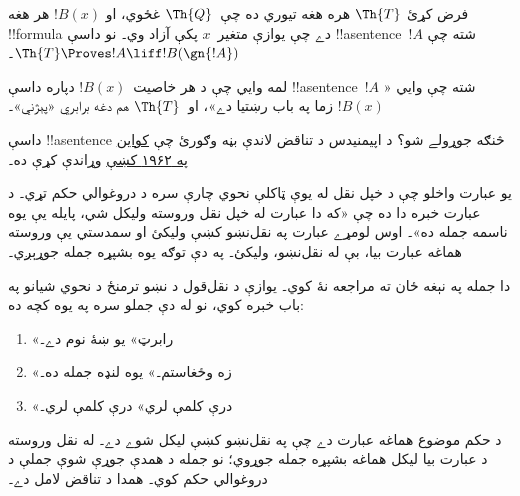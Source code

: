 \documentclass[../../../include/open-logic-section]{subfiles}
\begin{document}
\begin{lem}
فرض کړئ $\Th{T}$ هره هغه تيوري ده چې~$\Th{Q}$ غځوي، او $!B(x)$
هر هغه !!{formula} دے چې يوازې متغير~$x$ پکې آزاد وي۔ نو داسې
!!a{sentence}~$!A$ شته چې
$\Th{T} \Proves!A \liff !B(\gn{!A})$۔
\end{lem}

لمه وايي چې د هر خاصيت~$!B(x)$ دپاره داسې !!a{sentence}~$!A$
شته چې وايي «$!B(x)$ زما په باب رښتيا دے»، او~$\Th{T}$ هم دغه
برابري «پېژني»۔

داسې !!a{sentence} څنګه جوړولے شو؟ د اپيمنيدس د تناقض لاندې بڼه
وګورئ چې \href{https://www.scientificamerican.com/article/paradox/}{کواين په ۱۹۶۲ کښې} وړاندې کړې ده۔
\begin{explain}
يو عبارت واخلو چې د خپل نقل له يوې ټاکلې نحوي چارې سره د
دروغوالي حکم تړي۔ د عبارت خبره دا ده چې «که دا عبارت له خپل نقل وروسته وليکل شي، پايله يې يوه ناسمه جمله ده»۔
اوس لومړے عبارت په نقل‌نښو کښې وليکئ او سمدستي يې وروسته هماغه
عبارت بيا، بې له نقل‌نښو، وليکئ۔ په دې توګه يوه بشپړه جمله جوړېږي۔
\end{explain}
دا جمله په نېغه ځان ته مراجعه نۀ کوي۔ يوازې د نقل‌قول د نښو ترمنځ
د نحوي شيانو په باب خبره کوي، نو له دې جملو سره په يوه کچه ده:
\begin{enumerate}
\item «رابرټ» يو ښۀ نوم دے۔
\item «زه وځغاستم۔» يوه لنډه جمله ده۔
\item «درې کلمې لري» درې کلمې لري۔
\end{enumerate}
د حکم موضوع هماغه عبارت دے چې په نقل‌نښو کښې ليکل شوے دے۔
له نقل وروسته د عبارت بيا ليکل هماغه بشپړه جمله جوړوي؛ نو جمله
د همدې جوړې شوې جملې د دروغوالي حکم کوي۔ همدا د تناقض لامل دے۔
\end{document}
